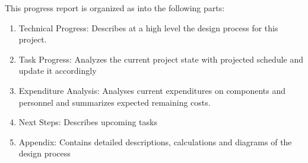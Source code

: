 This progress report is organized as into the following parts:
\begin{enumerate}
	\item Technical Progress: Describes at a high level the design process for this project.
	\item Task Progress: Analyzes the current project state with projected schedule and update it accordingly
	\item Expenditure Analysis: Analyses current expenditures on components and personnel and summarizes expected remaining costs.
	\item Next Steps: Describes upcoming tasks
	\item Appendix: Contains detailed descriptions, calculations and diagrams of the design process
\end{enumerate}